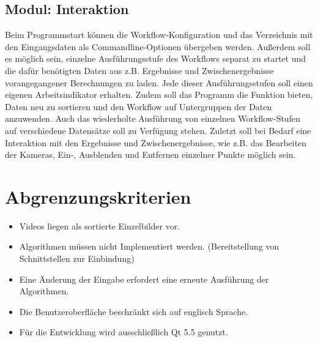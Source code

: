 \subsection{Modul: Interaktion}
Beim Programmstart können die Workflow-Konfiguration und das Verzeichnis mit den Eingangsdaten als Commandline-Optionen übergeben werden. Außerdem soll es möglich sein, einzelne Ausführungsstufe des Workflows separat zu startet und die dafür benötigten Daten aus z.B. Ergebnisse und Zwischenergebnisse vorangegangener Berechnungen zu laden. Jede dieser Ausführungsstufen soll einen eigenen Arbeitsindikator erhalten. Zudem soll das Programm die Funktion bieten, Daten neu zu sortieren und den Workflow auf Untergruppen der Daten anzuwenden. Auch das wiederholte Ausführung von einzelnen Workflow-Stufen auf verschiedene Datensätze soll zu Verfügung stehen. Zuletzt soll bei Bedarf eine Interaktion mit den Ergebnisse und Zwischenergebnisse, wie z.B. das Bearbeiten der Kameras, Ein-, Ausblenden und Entfernen einzelner Punkte möglich sein.

\section{Abgrenzungskriterien}
\begin{itemize}
	\item Videos liegen als sortierte Einzelbilder vor.
	\item Algorithmen müssen nicht Implementiert werden. (Bereitstellung von Schnittstellen zur Einbindung)
	\item Eine Änderung der Eingabe erfordert eine erneute Ausführung der Algorithmen.
	\item Die Benutzeroberfläche beschränkt sich auf englisch Sprache.
	\item Für die Entwicklung wird ausschließlich Qt 5.5 genutzt.
\end{itemize}